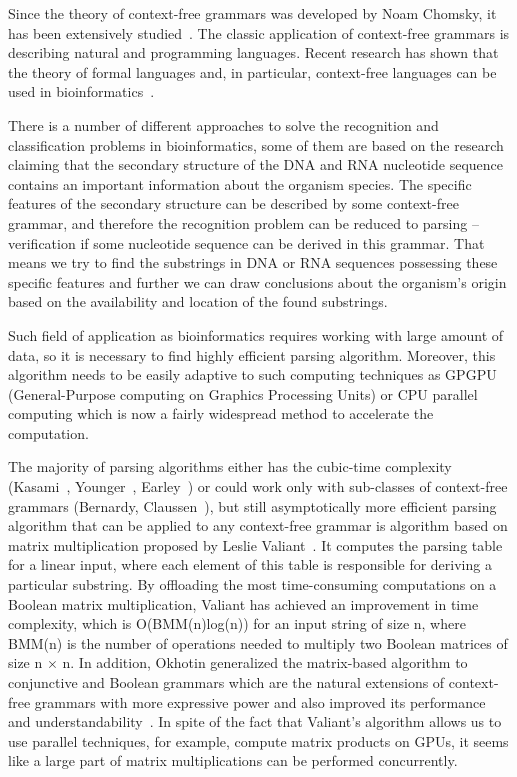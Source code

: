\documentclass[runningheads]{llncs}
\begin{document}
Since the theory of context-free grammars was developed by Noam Chomsky, it has been extensively studied~\cite{chomsky1,chomsky2}. The classic application of context-free grammars is describing natural and programming  languages. Recent  research has  shown  that the theory of formal languages and, in particular, context-free languages can be used in bioinformatics~\cite{rivas,knudsen,yuan,dowell}. 

There is a number of different approaches to solve the recognition and classification problems in bioinformatics, some of them are based on the research claiming that the secondary structure of the DNA and RNA nucleotide sequence contains an important information about the organism species. The specific features of the secondary structure can be described by some context-free grammar, and therefore the recognition problem can be reduced to parsing -- verification if some nucleotide sequence can be derived in this grammar. That means we try to find the substrings in DNA or RNA sequences possessing these specific features and further we can draw conclusions about the organism's origin based on the availability and location of the found substrings. 

Such field of application as bioinformatics requires working with large amount of data, so it is necessary to find highly efficient parsing algorithm. Moreover, this algorithm needs to be easily adaptive to such computing techniques as GPGPU (General-Purpose computing on Graphics Processing Units) or CPU parallel computing which is now a fairly widespread method to accelerate the computation.

The majority of parsing algorithms either has the cubic-time complexity (Kasami~\cite{kasami}, Younger~\cite{younger}, Earley~\cite{earley}) or could work only with sub-classes of context-free grammars (Bernardy, Claussen~\cite{bernardy}), but still asymptotically more efficient parsing algorithm that can be applied to any context-free grammar is algorithm based on matrix multiplication proposed by Leslie Valiant~\cite{valiant}. It computes the parsing table for a linear input, where each element of this table is responsible for deriving a particular substring. By offloading the most time-consuming computations on a Boolean matrix multiplication, Valiant has achieved an improvement in time complexity, which is O(BMM(n)log(n)) for an input string of size n, where BMM(n) is the number of operations needed to multiply two Boolean matrices of size n $\times$ n. In addition, Okhotin generalized the matrix-based algorithm to conjunctive and Boolean grammars which are the natural extensions of context-free grammars with more expressive power and also improved its performance and understandability~\cite{okhotin}. In spite of the fact that Valiant's algorithm allows us to use parallel techniques, for example, compute matrix products on GPUs, it seems like a large part of matrix multiplications can be performed concurrently. 
\end{document}
